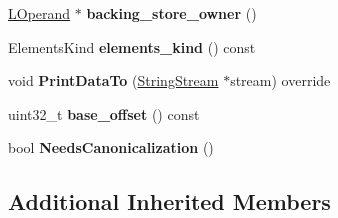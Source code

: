 \begin{DoxyCompactItemize}
\item 
\hyperlink{classv8_1_1internal_1_1_l_operand}{L\+Operand} $\ast$ {\bfseries backing\+\_\+store\+\_\+owner} ()\hypertarget{classv8_1_1internal_1_1_l_store_keyed_a21d192f5ddd6bbb5198880a6e2d03db3}{}\label{classv8_1_1internal_1_1_l_store_keyed_a21d192f5ddd6bbb5198880a6e2d03db3}

\item 
Elements\+Kind {\bfseries elements\+\_\+kind} () const \hypertarget{classv8_1_1internal_1_1_l_store_keyed_a09fd8ff5055daa16ec86a8f9bf4a1388}{}\label{classv8_1_1internal_1_1_l_store_keyed_a09fd8ff5055daa16ec86a8f9bf4a1388}

\item 
void {\bfseries Print\+Data\+To} (\hyperlink{classv8_1_1internal_1_1_string_stream}{String\+Stream} $\ast$stream) override\hypertarget{classv8_1_1internal_1_1_l_store_keyed_a6904d9c0c8c7e81ec9aab35f73978d38}{}\label{classv8_1_1internal_1_1_l_store_keyed_a6904d9c0c8c7e81ec9aab35f73978d38}

\item 
uint32\+\_\+t {\bfseries base\+\_\+offset} () const \hypertarget{classv8_1_1internal_1_1_l_store_keyed_aa88021608606f53948b262edeccda1e6}{}\label{classv8_1_1internal_1_1_l_store_keyed_aa88021608606f53948b262edeccda1e6}

\item 
bool {\bfseries Needs\+Canonicalization} ()\hypertarget{classv8_1_1internal_1_1_l_store_keyed_a638212d8d0abef68447e1451b452ac14}{}\label{classv8_1_1internal_1_1_l_store_keyed_a638212d8d0abef68447e1451b452ac14}

\end{DoxyCompactItemize}
\subsection*{Additional Inherited Members}


